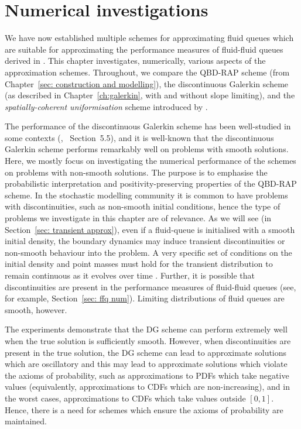 \chapter{Numerical investigations\label{sec: numerics}}
We have now established multiple schemes for approximating fluid queues which are suitable for approximating the performance measures of fluid-fluid queues derived in \cite{bo2014}. This chapter investigates, numerically, various aspects of the approximation schemes. Throughout, we compare the QBD-RAP scheme (from Chapter~\ref{sec: construction and modelling}), the discontinuous Galerkin scheme (as described in Chapter~\ref{ch:galerkin}, with and without slope limiting), and the \emph{spatially-coherent uniformisation} scheme introduced by \cite{bo2013}. 

The performance of the discontinuous Galerkin scheme has been well-studied in some contexts (\cite{c99}, \cite{nodalDGBook}~Section~5.5), and it is well-known that the discontinuous Galerkin scheme performs remarkably well on problems with smooth solutions. Here, we mostly focus on investigating the numerical performance of the schemes on problems with non-smooth solutions. The purpose is to emphasise the probabilistic interpretation and positivity-preserving properties of the QBD-RAP scheme. In the stochastic modelling community it is common to have problems with discontinuities, such as non-smooth initial conditions, hence the type of problems we investigate in this chapter are of relevance. As we will see (in Section~\ref{sec: transient approx}), even if a fluid-queue is initialised with a smooth initial density, the boundary dynamics may induce transient discontinuities or non-smooth behaviour into the problem. A very specific set of conditions on the initial density and point masses must hold for the transient distribution to remain continuous as it evolves over time \citep{bo2014,boz2022}. Further, it is possible that discontinuities are present in the performance measures of fluid-fluid queues (see, for example, Section~\ref{sec: ffq num}). Limiting distributions of fluid queues are smooth, however.

The experiments demonstrate that the DG scheme can perform extremely well when the true solution is sufficiently smooth. However, when discontinuities are present in the true solution, the DG scheme can lead to approximate solutions which are oscillatory and this may lead to approximate solutions which violate the axioms of probability, such as approximations to PDFs which take negative values (equivalently, approximations to CDFs which are non-increasing), and in the worst cases, approximations to CDFs which take values outside \([0,1]\). Hence, there is a need for schemes which ensure the axioms of probability are maintained. 

